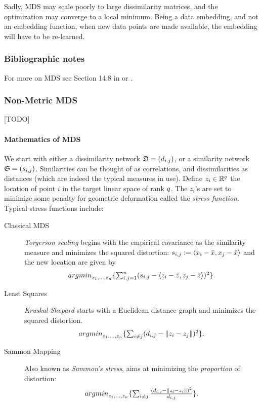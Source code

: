 \documentclass[12pt,a4paper]{article}
\begin{document}
Sadly, MDS may scale poorly to large dissimilarity matrices, and the optimization may converge to a local minimum.
Being a data embedding, and not an embedding function, when new data points are made available, the embedding will have to be re-learned.

\subsubsection{Bibliographic notes}
For more on MDS see Section 14.8 in \cite{friedman2001elements} or \cite{borg_modern_2005}.



\subsubsection{Non-Metric MDS}
[TODO]


\paragraph{Mathematics of MDS}
We start with either a dissimilarity network $\mathfrak{D}=(d_{i,j})$, or a similarity network $\mathfrak{S}=(s_{i,j})$.
Similarities can be thought of as correlations, and dissimilarities as distances (which are indeed the typical measures in use).
Define $z_i \in \mathbb{R}^q$ the location of point $i$ in the target linear space of rank $q$. 
The $z_i$'s are set to minimize some penalty for geometric deformation called the \emph{stress function}.
Typical stress functions include:
\begin{description}
	
	\item[Classical MDS] \Aka \emph{Torgerson scaling} begins with the empirical covariance as the similarity measure and minimizes the squared distortion:
	$s_{i,j}:= \left< x_i-\bar x,x_j-\bar{x} \right>$ and the new location are given by
	\begin{align}
	\label{eq:mds_classical}
	\textstyle{\mathop{argmin}_{z_1,\dots,z_n}}\{ \sum_{i,j=1}^{n} (s_{i,j}-\left< z_i-\bar z,z_j-\bar{z} \right> )^2 \}.
	\end{align}
	
	\item[Least Squares] \Aka \emph{Kruskal-Shepard} starts with a Euclidean distance graph and minimizes the squared distortion. 
	\begin{align}
	\label{eq:mds_stress}
	\textstyle{\mathop{argmin}_{z_1,\dots,z_n}}\{ \sum_{i \neq j} (d_{i,j}-\Vert z_i-z_j \Vert )^2 \}.
	\end{align}
	
	\item[Sammon Mapping] Also known as \emph{Sammon's stress}, aims at minimizing the \emph{proportion} of distortion:
	\begin{align}
	\label{eq:mds_sammon}
	\textstyle{\mathop{argmin}_{z_1,\dots,z_n}}\{ \sum_{i \neq j} \frac{(d_{i,j}-\Vert z_i-z_j \Vert )^2}{d_{i,j}} \}.
	\end{align}
	
\end{description}
\end{document}
